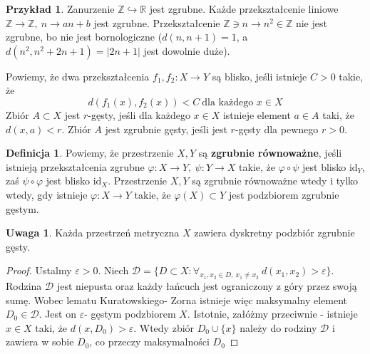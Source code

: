 \documentclass[licencjacka]{pracamgr}
\theoremstyle{definition}
\newtheorem{definition}{Definicja}[section]
\theoremstyle{definition}
\newtheorem{remark}{Uwaga}[section]
\theoremstyle{definition}
\theoremstyle{definition}
\newtheorem{example}{Przykład}[section]
\theoremstyle{definition}
\theoremstyle{plain}
\theoremstyle{plain}
\begin{document}
\begin{example}
	Zanurzenie $ \mathbb{Z} \hookrightarrow \mathbb{R} $ jest zgrubne. Każde 
	przekształcenie liniowe $ \mathbb{Z} \rightarrow \mathbb{Z}, ~ n \rightarrow
	an + b$ jest zgrubne. Przekształcenie $ \mathbb{Z} \ni n \rightarrow n^2 \in 
	\mathbb{Z} $ nie jest zgrubne, bo nie jest bornologiczne ($ d(n, n+1) = 1 $, a 
	$ d(n^2, n^2 + 2n + 1) = |2n+1| $ jest dowolnie duże).
\end{example}

Powiemy, że dwa przekształcenia $ f_1, f_2 : X \rightarrow Y $ są blisko, 
jeśli istnieje $ C > 0 $ takie, że $$ d(f_1(x), f_2(x)) < C  ~ \text{dla każdego } x \in X$$ 
Zbiór $ A \subset X $ jest $ r $-gęsty, jeśli dla każdego $ x \in X $ istnieje 
element $ a \in A $ taki, że $ d(x,a) < r $. Zbiór $ A $ jest zgrubnie gęsty, jeśli 
jest $ r $-gęsty dla pewnego $ r > 0 $.

\begin{definition}
	Powiemy, że przestrzenie $ X,Y $ są \textbf{zgrubnie równoważne}, jeśli 
	istnieją przekształcenia zgrubne $ \varphi : X \rightarrow Y, 
	~ \psi : Y \rightarrow X  $ takie, że 
	$ \varphi \circ \psi $ jest blisko $ \text{id}_Y $, zaś $ \psi \circ \varphi $ jest blisko 
	$ \text{id}_X $. Przestrzenie $ X,Y $ są zgrubnie równoważne wtedy i tylko wtedy, gdy 
	istnieje $ \varphi : X \rightarrow Y $ takie, że $ \varphi(X) \subset Y $ jest 
	podzbiorem zgrubnie gęstym.
\end{definition}

\begin{remark}
	Każda przestrzeń metryczna $ X $ zawiera dyskretny podzbiór zgrubnie gęsty.
\end{remark}
\begin{proof}
	Ustalmy $ \varepsilon > 0 $. Niech $ \mathcal{D} = \{D \subset X : \forall_{x_1, x_2 \in D, ~
	x_1 \neq x_2} ~ d(x_1, x_2) > \varepsilon \} $. Rodzina $ \mathcal{D} $ jest niepusta 
	oraz każdy łańcuch jest ograniczony z góry przez swoją sumę. Wobec lematu Kuratowskiego-
	Zorna istnieje więc maksymalny element $D_0 \in \mathcal{D}$. Jest on $ \varepsilon $-
	gęstym podzbiorem $ X $. Istotnie, załóżmy przeciwnie - istnieje $ x \in X $ taki, że 
	$ d(x, D_0) > \varepsilon $. Wtedy zbiór $ D_0 \cup \{x\} $ należy do rodziny 
	$ \mathcal{D} $ i zawiera w sobie $ D_0 $, co przeczy maksymalności $ D_0 $
\end{proof}
\end{document}
